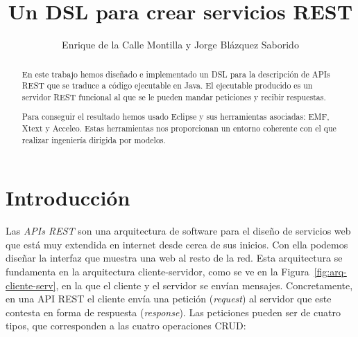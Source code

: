 \documentclass[runningheads]{llncs}
\begin{document}
\title{Un DSL para crear servicios REST}

\author{Enrique de la Calle Montilla y
Jorge Blázquez Saborido}

\maketitle

\begin{abstract}
En este trabajo hemos diseñado e implementado un DSL para la descripción
de APIs REST que se traduce a código ejecutable en Java. El ejecutable
producido es un servidor REST funcional al que se le pueden mandar
peticiones y recibir respuestas.

Para conseguir el resultado hemos usado Eclipse y sus herramientas
asociadas: EMF, Xtext y Acceleo. Estas herramientas nos proporcionan un
entorno coherente con el que realizar ingeniería dirigida por modelos.

\end{abstract}

\section{Introducción}


Las \emph{APIs REST} son una arquitectura de software para el diseño
de servicios web que está muy extendida en internet desde cerca de
sus inicios. Con ella podemos diseñar la interfaz que muestra una web
al resto de la red. Esta arquitectura se fundamenta en la arquitectura
cliente-servidor, como se ve en la Figura~\ref{fig:arq-cliente-serv},
en la que el cliente y el servidor se envían mensajes. Concretamente,
en una API REST el cliente envía una petición (\emph{request}) al
servidor que este contesta en forma de respuesta (\emph{response}). Las
peticiones pueden ser de cuatro tipos, que corresponden a las
cuatro operaciones CRUD:

\newcommand\POST{\texttt{POST}}
\newcommand\GET{\texttt{GET}}
\newcommand\PUT{\texttt{PUT}}
\newcommand\DELETE{\texttt{DELETE}}

\newcommand\CREATE{\texttt{CREATE}}
\newcommand\READ{\texttt{READ}}
\newcommand\UPDATE{\texttt{UPDATE}}
\end{document}
